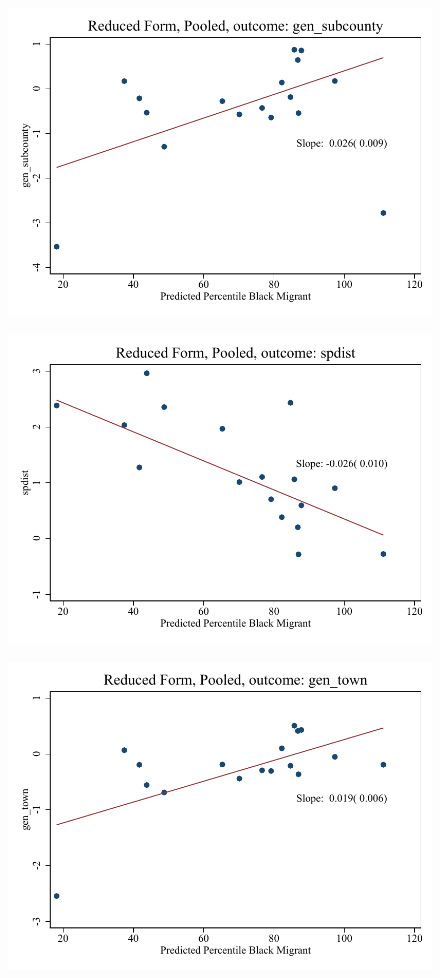 \documentclass{article}
\begin{document}
\clearpage
\begin{figure}
	\centering
	\includegraphics[width=.8\textwidth]{figures/binscatter/pooled_gen_subcounty_rf_percentile.pdf}
\end{figure}
\clearpage
\begin{figure}
	\centering
	\includegraphics[width=.8\textwidth]{figures/binscatter/pooled_spdist_rf_percentile.pdf}
\end{figure}
\clearpage
\begin{figure}
	\centering
	\includegraphics[width=.8\textwidth]{figures/binscatter/pooled_gen_town_rf_percentile.pdf}
\end{figure}
\end{document}
